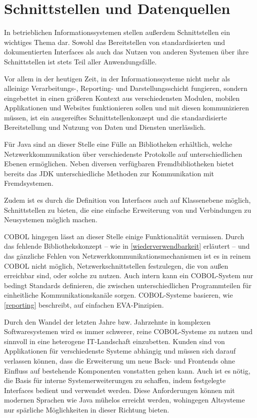 \section{Schnittstellen und Datenquellen}\label{schnittstellenDatenquellen}

In betrieblichen Informationssystemen stellen außerdem Schnittstellen ein wichtiges Thema dar. Sowohl das Bereitstellen von standardisierten und dokumentierten Interfaces als auch das Nutzen von anderen Systemen über ihre Schnittstellen ist stets Teil aller Anwendungsfälle. 

Vor allem in der heutigen Zeit, in der Informationssysteme nicht mehr als alleinige Verarbeitungs-, Reporting- und Darstellungsschicht fungieren, sondern eingebettet in einen größeren Kontext aus verschiedensten Modulen, mobilen Applikationen und Websites funktionieren sollen und mit diesen kommunizieren müssen, ist ein ausgereiftes Schnittstellenkonzept und die standardisierte Bereitstellung und Nutzung von Daten und Diensten unerlässlich.

Für Java sind an dieser Stelle eine Fülle an Bibliotheken erhältlich, welche Netzwerkkommunikation über verschiedenste Protokolle auf unterschiedlichen Ebenen ermöglichen. Neben diversen verfügbaren Fremdbibliotheken bietet bereits das JDK unterschiedliche Methoden zur Kommunikation mit Fremdsystemen.

Zudem ist es durch die Definition von Interfaces auch auf Klassenebene möglich, Schnittstellen zu bieten, die eine einfache Erweiterung von und Verbindungen zu Neusystemen möglich machen.

COBOL hingegen lässt an dieser Stelle einige Funktionalität vermissen. Durch das fehlende Bibliothekskonzept -- wie in \autoref{wiederverwendbarkeit} erläutert -- und das gänzliche Fehlen von Netzwerkkommunikationsmechanismen ist es in reinem COBOL nicht möglich, Netzwerkschnittstellen festzulegen, die von außen erreichbar sind, oder solche zu nutzen. Auch intern kann ein COBOL-System nur bedingt Standards definieren, die zwischen unterschiedlichen Programmteilen für einheitliche Kommunikationskanäle sorgen. COBOL-Systeme basieren, wie \autoref{reporting} beschreibt, auf einfachen EVA-Pinzipien.

Durch den Wandel der letzten Jahre bzw. Jahrzehnte in komplexen Softwaresystemen wird es immer schwerer, reine COBOL-Systeme zu nutzen und sinnvoll in eine heterogene IT-Landschaft einzubetten. Kunden sind von Applikationen für verschiedenste Systeme abhängig und müssen sich darauf verlassen können, dass die Erweiterung um neue Back- und Frontends ohne Einfluss auf bestehende Komponenten vonstatten gehen kann. Auch ist es nötig, die Basis für interne Systemerweiterungen zu schaffen, indem festgelegte Interfaces bedient und verwendet werden. Diese Anforderungen können mit modernen Sprachen wie Java mühelos erreicht werden, wohingegen Altsysteme nur spärliche Möglichkeiten in dieser Richtung bieten.
